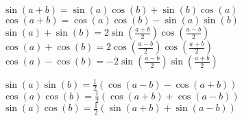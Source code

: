 \documentclass[../main.tex]{subfiles}
\begin{document}
\begin{minipage}{.5\textwidth}
    $\sin(a+b) = \sin(a)\cos(b) + \sin(b)\cos(a)$\\
    $\cos(a+b) = \cos(a)\cos(b) - \sin(a)\sin(b)$\\
    $\sin(a) + \sin(b) = 2\sin(\frac{a+b}{2})\cos(\frac{a-b}{2})$\\
    $\cos(a) + \cos(b) = 2\cos(\frac{a-b}{2})\cos(\frac{a+b}{2})$\\
    $\cos(a) - \cos(b) = -2\sin(\frac{a-b}{2})\sin(\frac{a+b}{2})$
\end{minipage}
\hfill
\begin{minipage}{.5\textwidth}
    $\sin(a)\sin(b) = \frac{1}{2}(\cos(a-b)-\cos(a+b))$\\
    $\cos(a)\cos(b) = \frac{1}{2}(\cos(a+b) + \cos(a-b))$\\
    $\sin(a)\cos(b) = \frac{1}{2} (\sin(a+b) + \sin(a-b))$\\
    
\end{minipage}
\end{document}
